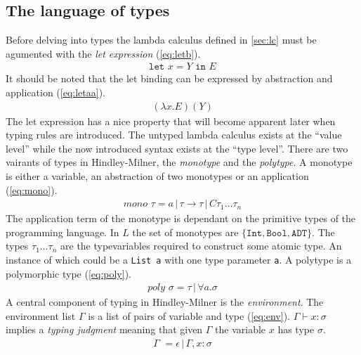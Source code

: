 \documentclass[11pt,oneside,a4paper]{report}
\begin{document}
\subsection{The language of types}
Before delving into types the lambda calculus defined in \autoref{sec:lc} must be agumented with the \textit{let expression} (\autoref{eq:letb}).
\begin{align}
	\texttt{let } x = Y \texttt{ in } E
	\label{eq:letb}
\end{align}
It should be noted that the let binding can be expressed by abstraction and application (\autoref{eq:letaa}).
\begin{align}
	(\lambda x . E) (Y)
	\label{eq:letaa}
\end{align}
The let expression has a nice property that will become apparent later when typing rules are introduced.
The untyped lambda calculus exists at the ``value level'' while the now introduced syntax exists at the ``type level''.
There are two vairants of types in Hindley-Milner, the \textit{monotype} and the \textit{polytype}.
A monotype is either a variable, an abstraction of two monotypes or an application (\autoref{eq:mono}).
\begin{align}
	mono \,\,\tau = a \,|\, \tau \rightarrow \tau \,|\, C \tau_1 \dots \tau_n
	\label{eq:mono}
\end{align}
The application term of the monotype is dependant on the primitive types of the programming language.
In $L$ the set of monotypes are $\{ \texttt{Int}, \texttt{Bool}, \texttt{ADT} \}$.
The types $\tau_1 \dots \tau_n$ are the typevariables required to construct some atomic type.
An instance of which could be a \texttt{List a} with one type parameter \texttt{a}.
A polytype is a polymorphic type (\autoref{eq:poly}).
\begin{align}
	poly \,\, \sigma = \tau \,|\, \forall a . \sigma
	\label{eq:poly}
\end{align}
A central component of typing in Hindley-Milner is the \textit{environment}.
The environment list $\Gamma$ is a list of pairs of variable and type (\autoref{eq:env}).
$\Gamma \vdash x: \sigma$ implies a \textit{typing judgment} meaning that given $\Gamma$ the variable $x$ has type $\sigma$.
\begin{align}
	\Gamma \,\, = \epsilon \,|\, \Gamma, x : \sigma
	\label{eq:env}
\end{align}
\end{document}

